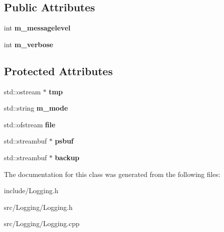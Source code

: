\subsection*{Public Attributes}
\begin{DoxyCompactItemize}
\item 
\hypertarget{classLogging_1_1MyStreamBuf_aadb5677582e31b1c7994c2cfa355edba}{int {\bfseries m\-\_\-messagelevel}}\label{classLogging_1_1MyStreamBuf_aadb5677582e31b1c7994c2cfa355edba}

\item 
\hypertarget{classLogging_1_1MyStreamBuf_afa47f8ca7e37b4408fdab52912e29c77}{int {\bfseries m\-\_\-verbose}}\label{classLogging_1_1MyStreamBuf_afa47f8ca7e37b4408fdab52912e29c77}

\end{DoxyCompactItemize}
\subsection*{Protected Attributes}
\begin{DoxyCompactItemize}
\item 
\hypertarget{classLogging_1_1MyStreamBuf_afa098901af4ff3f768fdc64850b464f5}{std\-::ostream $\ast$ {\bfseries tmp}}\label{classLogging_1_1MyStreamBuf_afa098901af4ff3f768fdc64850b464f5}

\item 
\hypertarget{classLogging_1_1MyStreamBuf_a4e11f05cc94cffb398bf51395f251b90}{std\-::string {\bfseries m\-\_\-mode}}\label{classLogging_1_1MyStreamBuf_a4e11f05cc94cffb398bf51395f251b90}

\item 
\hypertarget{classLogging_1_1MyStreamBuf_a47035c3dec1a0082191b06275195ce57}{std\-::ofstream {\bfseries file}}\label{classLogging_1_1MyStreamBuf_a47035c3dec1a0082191b06275195ce57}

\item 
\hypertarget{classLogging_1_1MyStreamBuf_aa987874aab0a38a608029ebb1bd6229f}{std\-::streambuf $\ast$ {\bfseries psbuf}}\label{classLogging_1_1MyStreamBuf_aa987874aab0a38a608029ebb1bd6229f}

\item 
\hypertarget{classLogging_1_1MyStreamBuf_abecdf6ccab9c410c4396035a8ad48112}{std\-::streambuf $\ast$ {\bfseries backup}}\label{classLogging_1_1MyStreamBuf_abecdf6ccab9c410c4396035a8ad48112}

\end{DoxyCompactItemize}


The documentation for this class was generated from the following files\-:\begin{DoxyCompactItemize}
\item 
include/Logging.\-h\item 
src/\-Logging/Logging.\-h\item 
src/\-Logging/Logging.\-cpp\end{DoxyCompactItemize}
